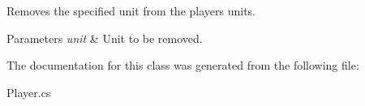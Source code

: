 Removes the specified unit from the player\textquotesingle{}s units. 
\begin{DoxyParams}{Parameters}
{\em unit} & Unit to be removed. \\
\hline
\end{DoxyParams}


The documentation for this class was generated from the following file\+:\begin{DoxyCompactItemize}
\item 
Player.\+cs\end{DoxyCompactItemize}
